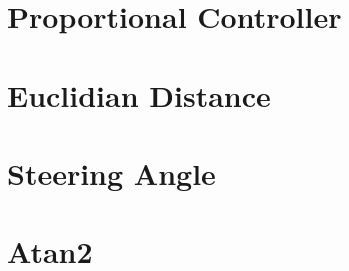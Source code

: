 \section{Proportional Controller}
\section{Euclidian Distance}
\section{Steering Angle}
\section{Atan2}



    

